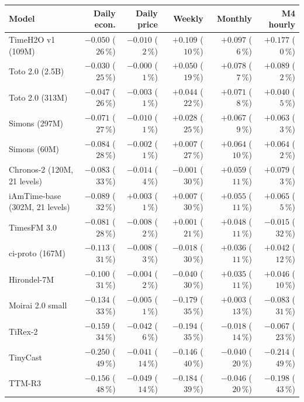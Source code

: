 \documentclass[article]{jss}
\begin{document}
\begin{table}[t!]
\centering
\small
\setlength{\tabcolsep}{4pt}
\begin{tabular}{lrrrrr}
\toprule
Model & Daily econ. & Daily price & Weekly & Monthly & M4 hourly \\
\midrule
TimeH2O v1 (109M) & $-0.050$ ($26\,\%$) & $-0.010$ ($2\,\%$) & $+0.109$ ($10\,\%$) & $+0.097$ ($6\,\%$) & $+0.177$ ($0\,\%$) \\
Toto 2.0 (2.5B) & $-0.030$ ($25\,\%$) & $-0.000$ ($1\,\%$) & $+0.050$ ($19\,\%$) & $+0.078$ ($7\,\%$) & $+0.089$ ($2\,\%$) \\
Toto 2.0 (313M) & $-0.047$ ($26\,\%$) & $-0.003$ ($1\,\%$) & $+0.044$ ($22\,\%$) & $+0.071$ ($8\,\%$) & $+0.040$ ($5\,\%$) \\
Simons (297M) & $-0.071$ ($27\,\%$) & $-0.010$ ($1\,\%$) & $+0.028$ ($25\,\%$) & $+0.067$ ($9\,\%$) & $+0.063$ ($3\,\%$) \\
Simons (60M) & $-0.084$ ($28\,\%$) & $-0.002$ ($1\,\%$) & $+0.007$ ($27\,\%$) & $+0.064$ ($10\,\%$) & $+0.064$ ($2\,\%$) \\
Chronos-2 (120M, 21 levels) & $-0.083$ ($33\,\%$) & $-0.014$ ($4\,\%$) & $-0.001$ ($30\,\%$) & $+0.059$ ($11\,\%$) & $+0.079$ ($3\,\%$) \\
iAmTime-base (302M, 21 levels) & $-0.089$ ($32\,\%$) & $+0.003$ ($1\,\%$) & $+0.007$ ($30\,\%$) & $+0.055$ ($11\,\%$) & $+0.065$ ($5\,\%$) \\
TimesFM 3.0 & $-0.081$ ($28\,\%$) & $-0.008$ ($2\,\%$) & $+0.001$ ($21\,\%$) & $+0.048$ ($11\,\%$) & $-0.015$ ($32\,\%$) \\
ci-proto (167M) & $-0.113$ ($31\,\%$) & $-0.008$ ($3\,\%$) & $-0.018$ ($30\,\%$) & $+0.036$ ($11\,\%$) & $+0.042$ ($12\,\%$) \\
Hirondel-7M & $-0.100$ ($31\,\%$) & $-0.004$ ($2\,\%$) & $-0.040$ ($30\,\%$) & $+0.035$ ($11\,\%$) & $+0.046$ ($10\,\%$) \\
Moirai 2.0 small & $-0.134$ ($33\,\%$) & $-0.005$ ($1\,\%$) & $-0.179$ ($35\,\%$) & $+0.003$ ($13\,\%$) & $-0.083$ ($31\,\%$) \\
TiRex-2 & $-0.159$ ($34\,\%$) & $-0.042$ ($6\,\%$) & $-0.194$ ($35\,\%$) & $-0.018$ ($14\,\%$) & $-0.067$ ($23\,\%$) \\
TinyCast & $-0.250$ ($49\,\%$) & $-0.041$ ($14\,\%$) & $-0.146$ ($40\,\%$) & $-0.040$ ($20\,\%$) & $-0.214$ ($49\,\%$) \\
TTM-R3 & $-0.156$ ($48\,\%$) & $-0.049$ ($14\,\%$) & $-0.184$ ($39\,\%$) & $-0.046$ ($20\,\%$) & $-0.198$ ($43\,\%$) \\

\end{tabular}
\end{table}
\end{document}
